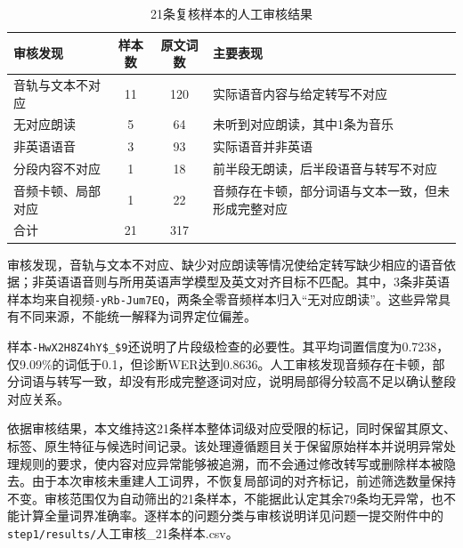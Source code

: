 \begin{table}[H]
    \centering\small
    \caption{21条复核样本的人工审核结果}
    \label{tab:p1_manual_review}
    \setlength{\tabcolsep}{6pt}
    \renewcommand{\arraystretch}{1.12}
    \ifdefined\pOneCompactTableBox\else\newsavebox{\pOneCompactTableBox}\fi
    \begin{lrbox}{\pOneCompactTableBox}
    \begin{tabular}{lcc>{\raggedright\arraybackslash}p{18em}}
        \toprule
        审核发现 & 样本数 & 原文词数 & 主要表现\\
        \midrule
        音轨与文本不对应 & 11 & 120 & 实际语音内容与给定转写不对应\\
        无对应朗读 & 5 & 64 & 未听到对应朗读，其中1条为音乐\\
        非英语语音 & 3 & 93 & 实际语音并非英语\\
        分段内容不对应 & 1 & 18 & 前半段无朗读，后半段语音与转写不对应\\
        音频卡顿、局部对应 & 1 & 22 & 音频存在卡顿，部分词语与文本一致，但未形成完整对应\\
        \midrule
        合计 & 21 & 317 & \\
        \bottomrule
    \end{tabular}
    \end{lrbox}
    \usebox{\pOneCompactTableBox}
\end{table}

审核发现，音轨与文本不对应、缺少对应朗读等情况使给定转写缺少相应的语音依据；非英语语音则与所用英语声学模型及英文对齐目标不匹配。其中，3条非英语样本均来自视频\nolinkurl{-yRb-Jum7EQ}，两条全零音频样本归入“无对应朗读”。这些异常具有不同来源，不能统一解释为词界定位偏差。

样本\nolinkurl{-HwX2H8Z4hY$_$9}还说明了片段级检查的必要性。其平均词置信度为0.7238，仅9.09\%的词低于0.1，但诊断WER达到0.8636。人工审核发现音频存在卡顿，部分词语与转写一致，却没有形成完整逐词对应，说明局部得分较高不足以确认整段对应关系。

依据审核结果，本文维持这21条样本整体词级对应受限的标记，同时保留其原文、标签、原生特征与候选时间记录。该处理遵循题目关于保留原始样本并说明异常处理规则的要求，使内容对应异常能够被追溯，而不会通过修改转写或删除样本被隐去。由于本次审核未重建人工词界，不恢复局部词的对齐标记，前述筛选数量保持不变。审核范围仅为自动筛出的21条样本，不能据此认定其余79条均无异常，也不能计算全量词界准确率。逐样本的问题分类与审核说明详见问题一提交附件中的\nolinkurl{step1/results/}\textnormal{人工审核\_21条样本.csv}。

